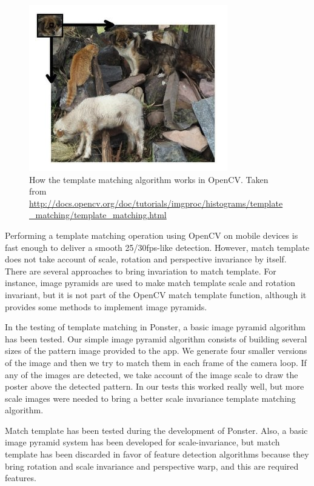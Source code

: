 \begin{figure}
\centering
\includegraphics[scale=0.55]{img/templatematch.png}
\caption{\label{fig:templatematch}How the template matching algorithm works in
  OpenCV. Taken from
  \url{http://docs.opencv.org/doc/tutorials/imgproc/histograms/template_matching/template_matching.html}} 
\end{figure} 

Performing a template matching operation using OpenCV on mobile devices is fast
enough to deliver a smooth 25/30fps-like detection. However, match template does not
take account of scale, rotation and perspective invariance by itself. There are
several approaches to bring invariation to match template. For instance, image
pyramids are used to make match template scale and rotation
invariant\cite{4368176}, but it is not part of the OpenCV match template function, although it
provides some methods to implement image pyramids\cite{ocv02}. 

In the testing of template matching in Ponster, a basic image pyramid algorithm
has been tested. Our simple image pyramid algorithm consists of building
several sizes of the pattern image provided to the app. We generate four
smaller versions of the image and then we try to match them in each frame of
the camera loop. If any of the images are detected, we take account of the
image scale to draw the poster above the detected pattern. In our tests this
worked really well, but more scale images were needed to bring a better scale
invariance template matching algorithm.

Match template has been tested during the development of Ponster. Also, a basic
image pyramid system has been developed for scale-invariance, but match template has
been discarded in favor of feature detection algorithms because they bring rotation
and scale invariance and perspective warp, and this are required features.

